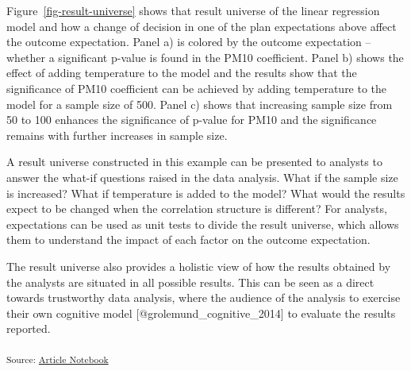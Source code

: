 \documentclass[
]{jds}
\begin{document}
Figure~\ref{fig-result-universe} shows that result universe of the
linear regression model and how a change of decision in one of the plan
expectations above affect the outcome expectation. Panel a) is colored
by the outcome expectation -- whether a significant p-value is found in
the PM10 coefficient. Panel b) shows the effect of adding temperature to
the model and the results show that the significance of PM10 coefficient
can be achieved by adding temperature to the model for a sample size of
500. Panel c) shows that increasing sample size from 50 to 100 enhances
the significance of p-value for PM10 and the significance remains with
further increases in sample size.

A result universe constructed in this example can be presented to
analysts to answer the what-if questions raised in the data analysis.
What if the sample size is increased? What if temperature is added to
the model? What would the results expect to be changed when the
correlation structure is different? For analysts, expectations can be
used as unit tests to divide the result universe, which allows them to
understand the impact of each factor on the outcome expectation.

The result universe also provides a holistic view of how the results
obtained by the analysts are situated in all possible results. This can
be seen as a direct towards trustworthy data analysis, where the
audience of the analysis to exercise their own cognitive model
{[}@grolemund\_cognitive\_2014{]} to evaluate the results reported.

\textsubscript{Source:
\href{https://huizezhang-sherry.github.io/paper-analysis-plan/index.qmd.html}{Article
Notebook}}
\end{document}
